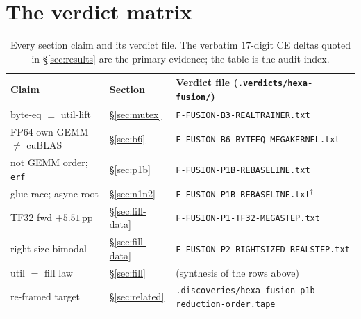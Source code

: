 \documentclass[11pt,a4paper]{article}
\begin{document}
\appendix

\section{The verdict matrix}
\label{app:matrix}

\begin{table}[h]
\centering
\caption{Every section claim and its verdict file. The verbatim $17$-digit CE
deltas quoted in \S\ref{sec:results} are the primary evidence; the table is
the audit index.}
\label{tab:matrix}
\small
\begin{tabular}{lll}
\toprule
Claim & Section & Verdict file (\texttt{.verdicts/hexa-fusion/}) \\
\midrule
byte-eq $\perp$ util-lift & \S\ref{sec:mutex} & \texttt{F-FUSION-B3-REALTRAINER.txt} \\
FP64 own-GEMM $\neq$ cuBLAS & \S\ref{sec:b6} & \texttt{F-FUSION-B6-BYTEEQ-MEGAKERNEL.txt} \\
not GEMM order; \texttt{erf} & \S\ref{sec:p1b} & \texttt{F-FUSION-P1B-REBASELINE.txt} \\
glue race; async root & \S\ref{sec:n1n2} & \texttt{F-FUSION-P1B-REBASELINE.txt}$^\dagger$ \\
TF32 fwd $+5.51$\,pp & \S\ref{sec:fill-data} & \texttt{F-FUSION-P1-TF32-MEGASTEP.txt} \\
right-size bimodal & \S\ref{sec:fill-data} & \texttt{F-FUSION-P2-RIGHTSIZED-REALSTEP.txt} \\
util $=$ fill law & \S\ref{sec:fill} & (synthesis of the rows above) \\
re-framed target & \S\ref{sec:related} & \texttt{.discoveries/hexa-fusion-p1b-reduction-order.tape} \\
\bottomrule
\end{tabular}
\end{table}




\end{document}
